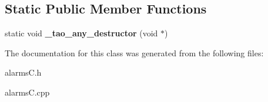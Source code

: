 \subsection*{Static Public Member Functions}
\begin{DoxyCompactItemize}
\item 
static void {\bfseries \+\_\+tao\+\_\+any\+\_\+destructor} (void $\ast$)\label{classalarms_1_1AlarmInformationSequence_af5b45edc119394f7cb0a91591827b8c8}

\end{DoxyCompactItemize}


The documentation for this class was generated from the following files\+:\begin{DoxyCompactItemize}
\item 
alarms\+C.\+h\item 
alarms\+C.\+cpp\end{DoxyCompactItemize}
